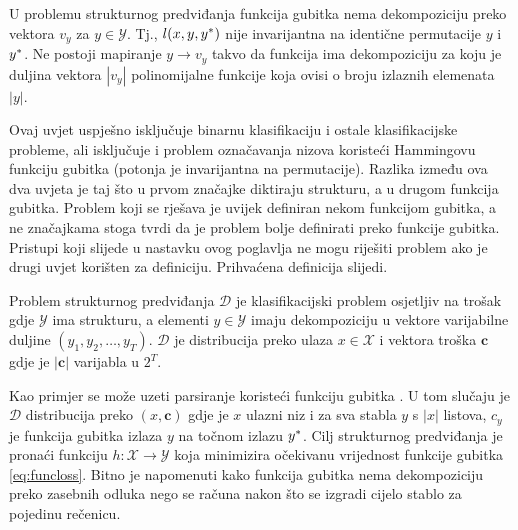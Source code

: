 \begin{condition}

  U problemu strukturnog predviđanja funkcija gubitka nema dekompoziciju preko
  vektora $v_y$ za $y \in \mathcal{Y}$. Tj., $l(x, y, y\ssymbol{1})$ nije
  invarijantna na identične permutacije $y$ i $y\ssymbol{1}$. Ne postoji
  mapiranje $y \to v_y$ takvo da funkcija ima dekompoziciju za koju je duljina
  vektora $|v_y|$ polinomijalne funkcije koja ovisi o broju izlaznih elemenata
  $|y|$.

\end{condition}

\noindent
Ovaj uvjet uspješno isključuje binarnu klasifikaciju i ostale klasifikacijske
probleme, ali isključuje i problem označavanja nizova koristeći Hammingovu
funkciju gubitka (potonja je invarijantna na permutacije). Razlika između ova
dva uvjeta je taj što u prvom značajke diktiraju strukturu, a u drugom funkcija
gubitka. Problem koji se rješava je uvijek definiran nekom funkcijom gubitka, a
ne značajkama stoga \citeauthor{daume06thesis} tvrdi da je problem bolje
definirati preko funkcije gubitka. Pristupi koji slijede u nastavku ovog
poglavlja ne mogu riješiti problem ako je drugi uvjet korišten za definiciju.
Prihvaćena definicija slijedi.

\begin{definition} \label{def:jointlearn}

  Problem strukturnog predviđanja $\mathcal{D}$ je klasifikacijski problem
  osjetljiv na trošak  gdje
  $\mathcal{Y}$ ima strukturu, a elementi $y \in \mathcal{Y}$ imaju
  dekompoziciju u vektore varijabilne duljine $(y_1, y_2, \ldots, y_T)$.
  $\mathcal{D}$ je distribucija preko ulaza $x \in \mathcal{X}$ i vektora troška
  $\mathbf{c}$ gdje je $|\mathbf{c}|$ varijabla u $2^T$.

\end{definition}

\noindent
Kao primjer se može uzeti parsiranje koristeći funkciju gubitka
. U tom slučaju je $\mathcal{D}$ distribucija preko $(x,
\mathbf{c})$ gdje je $x$ ulazni niz i za sva stabla $y$ s $|x|$ listova, $c_y$
je funkcija gubitka  izlaza $y$ na točnom izlazu
$y\ssymbol{1}$. Cilj strukturnog predviđanja je pronaći funkciju $h: \mathcal{X}
\rightarrow \mathcal{Y}$ koja minimizira očekivanu vrijednost funkcije gubitka
\ref{eq:funcloss}. Bitno je napomenuti kako funkcija gubitka
 nema dekompoziciju preko zasebnih odluka nego se računa
nakon što se izgradi cijelo stablo za pojedinu rečenicu.

